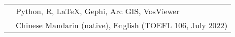\documentclass[letterpaper, 11pt]{article}
\begin{document}
\begin{longtable}{p{1.3in}p{4.8in}}

{\color{RoyalBlue}{Skills}} 
&Python, R, LaTeX, Gephi, Arc GIS, VosViewer\\

{\color{RoyalBlue}{Languages}} 
&Chinese Mandarin (native), English (TOEFL 106, July 2022) \\








\end{longtable}
\end{document}
